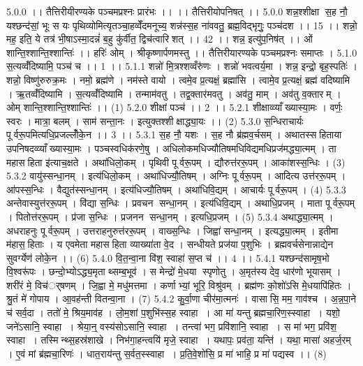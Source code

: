 \setcounter{anuvakam}{0}
5.0.0
।। तैत्तिरीयीरण्यके पञ्चमप्रश्नः प्रारंभः ।। ।। तैत्तिरीयोपनिषत् ।।
5.0.0
शन्न॒श्शीक्षा स॒ह नौ॒ यश्छन्द॑सां॒ भूः स यः पृथिव्योमित्यृतञ्चा॒हव्वेँदमनूच्य॒ शन्न॑स्स॒ह ना॑ववतु॒ ब्रह्म॒विद्भृगुः॒ पञ्च॑दश ।। 15 ।। शन्नो॒ मह॒ इति॒ ये तत्र॑ भी॒षाऽस्मा॒दन्नं॑ ब॒हु कु॑र्वीत॒ द्विच॑त्वारिशत् ।। 42 ।। शन्न॒ इत्यु॑प॒निष॑त् ।। ओं शान्ति॒श्शान्ति॒श्शान्तिः॑ ।। हरिः॑ ओम् । श्रीकृष्णार्पणमस्तु ।। तैत्तिरीयारण्यके पञ्चमप्रश्नः समाप्तः ।
5.1.0
स॒त्यव्वँ॑दिष्यामि॒ पञ्च॑ च ।। 1 ।।
5.1.1
शन्नो॑ मि॒त्रश्शव्वँरु॑णः । शन्नो॑ भवत्वर्य॒मा । शन्न॒ इन्द्रो॒ बृह॒स्पतिः॑ । शन्नो॒ विष्णु॑रुरुक्र॒मः । नमो॒ ब्रह्म॑णे । नम॑स्ते वायो । त्वमे॒व प्र॒त्यक्षं॒ ब्रह्मा॑सि । त्वामे॒व प्र॒त्यक्षं॒ ब्रह्म॑ वदिष्यामि । ऋ॒तव्वँ॑दिष्यामि । स॒त्यव्वँ॑दिष्यामि । तन्माम॑वतु । तद्व॒क्तार॑मवतु । अव॑तु॒ माम् । अव॑तु व॒क्तारम् । ओम् शान्ति॒श्शान्ति॒श्शान्तिः॑ ।। (1)
5.2.0
शीक्षां पञ्च॑ ।। 2 ।।
5.2.1
शीक्षाव्व्याँख्यास्या॒मः । वर्णः॒ स्वरः । मात्रा॒ बलम् । साम॑ सन्ता॒नः । इत्युक्तश्शीक्षाद्ध्या॒यः ।। (2)
5.3.0
स॒न्धिराचार्यः पूर्वरू॒पमित्यधि॒प्रजल्लोँ॑के॒न ।। 3 ।।
5.3.1
स॒ह नौ॒ यशः । स॒ह नौ ब्र॑ह्मव॒र्चसम् । अथातस्सहिताया उपनिषदव्व्याँख्यास्या॒मः । पञ्चस्वधिक॑रणे॒षु । अधिलोकमधिज्यौतिषमधिविद्यमधिप्रज॑मद्ध्या॒त्मम् । ता महासहिता इ॑त्याच॒क्षते । अथा॑धिलो॒कम् । पृथिवी पूर्वरू॒पम् । द्यौरुत्त॑ररू॒पम् । आका॑शस्स॒न्धिः । (3)
5.3.2
वायु॑स्सन्धा॒नम् । इत्य॑धिलो॒कम् । अथा॑धिज्यौ॒तिषम् । अग्निः पूर्वरू॒पम् । आदित्य उत्त॑ररू॒पम् । आ॑पस्स॒न्धिः । वैद्युत॑स्सन्धा॒नम् । इत्य॑धिज्यौ॒तिषम् । अथा॑धिवि॒द्यम् । आचार्यः पूर्वरू॒पम् । (4)
5.3.3
अन्तेवास्युत्त॑ररू॒पम् । वि॑द्या स॒न्धिः । प्रवचन॑ सन्धा॒नम् । इत्य॑धिवि॒द्यम् । अथाधि॒प्रजम् । माता पूर्वरू॒पम् । पितोत्त॑ररू॒पम् । प्र॑जा स॒न्धिः । प्रजनन॑ सन्धा॒नम् । इत्यधि॒प्रजम् । (5)
5.3.4
अथाद्ध्या॒त्मम् । अधराहनुः पूर्वरू॒पम् । उत्तराहनुरुत्त॑ररू॒पम् । वाख्स॒न्धिः । जिह्वा॑ सन्धा॒नम् । इत्यद्ध्या॒त्मम् । इतीमा म॑हास॒॒हिताः । य एवमेता महासहिता व्याख्या॑ता वे॒द । सन्धीयते प्रज॑या प॒शुभिः । ब्रह्मवर्चसेनान्नाद्येन सुवर्ग्येण॑ लोके॒न ।। (6)
5.4.0
वि॒त॒न्वा॒ना वि॑श॒ स्वाहा॑ स॒प्त च॑ ।। 4 ।।
5.4.1
यश्छन्द॑सामृष॒भो वि॒श्वरू॑पः । छन्दो॒भ्योऽद्ध्य॒मृताथ्सम्ब॒भूव॑ । स मेन्द्रो॑ मे॒धया स्पृणोतु । अ॒मृत॑स्य देव॒ धार॑णो भूयासम् । शरी॑रं मे॒ विच॑र््षणम् । जि॒ह्वा मे॒ मधु॑मत्तमा । कर्णाभ्यां॒ भूरि॒ विश्रु॑वम् । ब्रह्म॑णः को॒शो॑ऽसि मे॒धयापि॑हितः । श्रु॒तं मे॑ गोपाय । आ॒वह॑न्ती वितन्वा॒ना । (7)
5.4.2
कु॒र्वा॒णा चीर॑मा॒त्मनः॑ । वासा॑सि॒ मम॒ गाव॑श्च । अ॒न्न॒पा॒ने च॑ सर्व॒दा । ततो॑ मे॒ श्रिय॒माव॑ह । लो॒म॒शां प॒शुभि॑स्स॒ह स्वाहा । आ मा॑ यन्तु ब्रह्मचा॒रिण॒स्स्वाहा । यशो॒ जने॑ऽसानि॒ स्वाहा । श्रेया॒न्॒ वस्य॑सोऽसानि॒ स्वाहा । तन्त्वा॑ भग॒ प्रवि॑शानि॒ स्वाहा । स मा॑ भग॒ प्रवि॑श॒ स्वाहा । तस्मिन्थ्स॒हस्र॑शाखे । निभ॑गा॒हन्त्वयि॑ मृजे॒ स्वाहा । यथापः॒ प्रव॑ता॒ यन्ति॑ । यथा॒ मासा॑ अहर्ज॒रम् । ए॒वं मां ब्र॑ह्मचा॒रिणः॑ । धात॒राय॑न्तु स॒र्वत॒स्स्वाहा । प्र॒ति॒वे॒शो॑सि॒ प्र मा॑ भाहि॒ प्र मा॑ पद्यस्व ।। (8)
